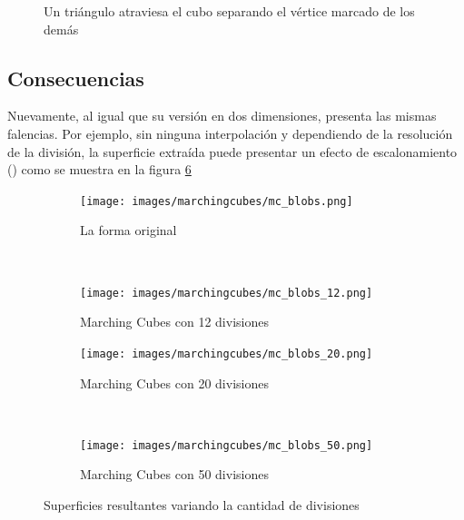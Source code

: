 \begin{figure}[ht]
\centering
\caption{Un triángulo atraviesa el cubo separando el vértice marcado de los demás}
\label{f:estadoDelArte:cube_03}
\end{figure}

\subsection{Consecuencias}
\label{subsec:marchingCubes:consecuencias}

Nuevamente, al igual que su versión en dos dimensiones, presenta las mismas falencias.
Por ejemplo, sin ninguna interpolación y dependiendo de la resolución de la división, la
superficie extraída puede presentar un efecto de escalonamiento () como se
muestra en la figura \ref{f:estadoDelArte;superficies_resultantes_variando_divisiones}

\begin{figure}

	\begin{subfigure}{0.45\textwidth}
		\centering
		\texttt{[image: images/marchingcubes/mc\_blobs.png]}
		\caption{La forma original}
		\label{f:estadoDelArte:mc_blobs}
	\end{subfigure}
	~
	\begin{subfigure}{0.45\textwidth}
		\centering
		\texttt{[image: images/marchingcubes/mc\_blobs\_12.png]}
		\caption{Marching Cubes con 12 divisiones}
		\label{f:estadoDelArte:mc_blobs_12}
	\end{subfigure}

	\begin{subfigure}{0.45\textwidth}
		\centering
		\texttt{[image: images/marchingcubes/mc\_blobs\_20.png]}
		\caption{Marching Cubes con 20 divisiones}
		\label{f:estadoDelArte:mc_blobs_20}
	\end{subfigure}
	~
	\begin{subfigure}{0.45\textwidth}
		\centering
		\texttt{[image: images/marchingcubes/mc\_blobs\_50.png]}
		\caption{Marching Cubes con 50 divisiones}
		\label{f:estadoDelArte:mc_blobs_50}
	\end{subfigure}

	\caption{Superficies resultantes variando la cantidad de divisiones}
	\label{f:estadoDelArte;superficies_resultantes_variando_divisiones}
\end{figure}

